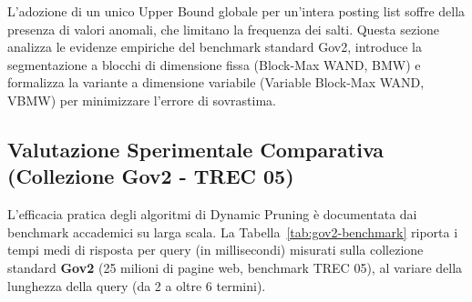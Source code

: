L'adozione di un unico Upper Bound globale per un'intera posting list soffre della presenza di valori anomali, che limitano la frequenza dei salti. Questa sezione analizza le evidenze empiriche del benchmark standard Gov2, introduce la segmentazione a blocchi di dimensione fissa (Block-Max WAND, BMW) e formalizza la variante a dimensione variabile (Variable Block-Max WAND, VBMW) per minimizzare l'errore di sovrastima.

\FloatBarrier
\subsection{Valutazione Sperimentale Comparativa (Collezione Gov2 - TREC 05)}
\label{subsec:benchmark-gov2}
L'efficacia pratica degli algoritmi di Dynamic Pruning \`e documentata dai benchmark accademici su larga scala. La Tabella~\ref{tab:gov2-benchmark} riporta i tempi medi di risposta per query (in millisecondi) misurati sulla collezione standard \textbf{Gov2} (25 milioni di pagine web, benchmark TREC 05), al variare della lunghezza della query (da 2 a oltre 6 termini).

\begin{table}[H]
\centering
\small
{}
\caption{Tempi medi di query processing (Top-10) su collezione Gov2 (TREC 05) al variare del numero di termini. Fonte: Ding \& Suel~\cite{ding2011}, Mallia et al.~\cite{mallia2017}.}
\label{tab:gov2-benchmark}
\end{table}


